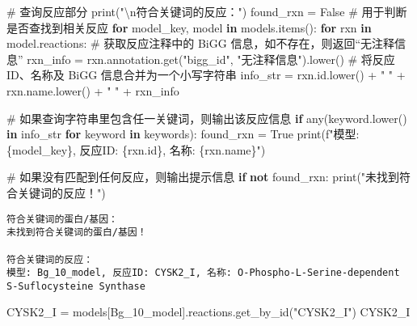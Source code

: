 \documentclass[
  letterpaper,
  DIV=11,
  numbers=noendperiod]{scrartcl}
\newenvironment{Shaded}{\begin{snugshade}}{\end{snugshade}}
\newcommand{\BuiltInTok}[1]{\textcolor[rgb]{0.00,0.23,0.31}{#1}}
\newcommand{\CharTok}[1]{\textcolor[rgb]{0.13,0.47,0.30}{#1}}
\newcommand{\CommentTok}[1]{\textcolor[rgb]{0.37,0.37,0.37}{#1}}
\newcommand{\ControlFlowTok}[1]{\textcolor[rgb]{0.00,0.23,0.31}{\textbf{#1}}}
\newcommand{\KeywordTok}[1]{\textcolor[rgb]{0.00,0.23,0.31}{\textbf{#1}}}
\newcommand{\NormalTok}[1]{\textcolor[rgb]{0.00,0.23,0.31}{#1}}
\newcommand{\OperatorTok}[1]{\textcolor[rgb]{0.37,0.37,0.37}{#1}}
\newcommand{\SpecialCharTok}[1]{\textcolor[rgb]{0.37,0.37,0.37}{#1}}
\newcommand{\SpecialStringTok}[1]{\textcolor[rgb]{0.13,0.47,0.30}{#1}}
\newcommand{\StringTok}[1]{\textcolor[rgb]{0.13,0.47,0.30}{#1}}
\newcommand{\VariableTok}[1]{\textcolor[rgb]{0.07,0.07,0.07}{#1}}
\begin{document}
\begin{Shaded}
\begin{Highlighting}[]
\CommentTok{\# 查询反应部分}
\BuiltInTok{print}\NormalTok{(}\StringTok{"}\CharTok{\textbackslash{}n}\StringTok{符合关键词的反应："}\NormalTok{)}
\NormalTok{found\_rxn }\OperatorTok{=} \VariableTok{False}  \CommentTok{\# 用于判断是否查找到相关反应}
\ControlFlowTok{for}\NormalTok{ model\_key, model }\KeywordTok{in}\NormalTok{ models.items():}
    \ControlFlowTok{for}\NormalTok{ rxn }\KeywordTok{in}\NormalTok{ model.reactions:}
        \CommentTok{\# 获取反应注释中的 BiGG 信息，如不存在，则返回“无注释信息”}
\NormalTok{        rxn\_info }\OperatorTok{=}\NormalTok{ rxn.annotation.get(}\StringTok{"bigg\_id"}\NormalTok{, }\StringTok{"无注释信息"}\NormalTok{).lower()}
        \CommentTok{\# 将反应ID、名称及 BiGG 信息合并为一个小写字符串}
\NormalTok{        info\_str }\OperatorTok{=}\NormalTok{ rxn.}\BuiltInTok{id}\NormalTok{.lower() }\OperatorTok{+} \StringTok{" "} \OperatorTok{+}\NormalTok{ rxn.name.lower() }\OperatorTok{+} \StringTok{" "} \OperatorTok{+}\NormalTok{ rxn\_info}
        
        \CommentTok{\# 如果查询字符串里包含任一关键词，则输出该反应信息}
        \ControlFlowTok{if} \BuiltInTok{any}\NormalTok{(keyword.lower() }\KeywordTok{in}\NormalTok{ info\_str }\ControlFlowTok{for}\NormalTok{ keyword }\KeywordTok{in}\NormalTok{ keywords):}
\NormalTok{            found\_rxn }\OperatorTok{=} \VariableTok{True}
            \BuiltInTok{print}\NormalTok{(}\SpecialStringTok{f"模型: }\SpecialCharTok{\{}\NormalTok{model\_key}\SpecialCharTok{\}}\SpecialStringTok{, 反应ID: }\SpecialCharTok{\{}\NormalTok{rxn}\SpecialCharTok{.}\BuiltInTok{id}\SpecialCharTok{\}}\SpecialStringTok{, 名称: }\SpecialCharTok{\{}\NormalTok{rxn}\SpecialCharTok{.}\NormalTok{name}\SpecialCharTok{\}}\SpecialStringTok{"}\NormalTok{)}

\CommentTok{\# 如果没有匹配到任何反应，则输出提示信息}
\ControlFlowTok{if} \KeywordTok{not}\NormalTok{ found\_rxn:}
    \BuiltInTok{print}\NormalTok{(}\StringTok{"未找到符合关键词的反应！"}\NormalTok{)}
\end{Highlighting}
\end{Shaded}

\begin{verbatim}
符合关键词的蛋白/基因：
未找到符合关键词的蛋白/基因！

符合关键词的反应：
模型: Bg_10_model, 反应ID: CYSK2_I, 名称: O-Phospho-L-Serine-dependent S-Suflocysteine Synthase
\end{verbatim}

\begin{Shaded}
\begin{Highlighting}[]
\NormalTok{CYSK2\_I }\OperatorTok{=}\NormalTok{ models[}\StringTok{\textquotesingle{}Bg\_10\_model\textquotesingle{}}\NormalTok{].reactions.get\_by\_id(}\StringTok{"CYSK2\_I"}\NormalTok{)}
\NormalTok{CYSK2\_I}
\end{Highlighting}
\end{Shaded}
\end{document}
